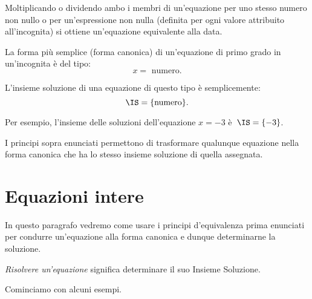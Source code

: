 \begin{principio}
 Moltiplicando o dividendo ambo i membri di
un'equazione per uno stesso numero non nullo o per
un'espressione non nulla (definita per ogni valore
attribuito all'incognita) si ottiene
un'equazione equivalente alla data.
\end{principio}


La forma più semplice (forma canonica) di un'equazione di primo grado in
un'incognita è del tipo:
\[x = \text{ numero}.\]

L'insieme soluzione di una
equazione di questo tipo è semplicemente:
\[\IS=\{\text{numero}\}.\]

Per esempio, l'insieme delle soluzioni dell'equazione
$x = -3$ è~$\IS =\{-3\}$.

I principi sopra enunciati permettono di trasformare qualunque equazione
nella forma canonica che ha lo stesso insieme soluzione di quella
assegnata.

\section{Equazioni intere}
In questo paragrafo vedremo come usare i principi
d'equivalenza prima enunciati per condurre
un'equazione alla forma canonica e dunque determinarne
la soluzione.

\begin{definizione}
\emph{Risolvere un'equazione} significa
determinare il suo Insieme Soluzione.
\end{definizione}

Cominciamo con alcuni esempi.

